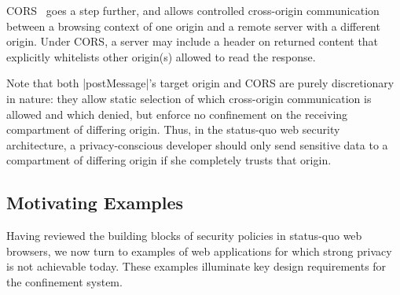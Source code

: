 
CORS~\cite{cors13} goes a step further, and allows controlled
cross-origin communication between a browsing context of one origin
and a remote server with a different origin. Under CORS, a server may
include a header on returned content that explicitly whitelists other
origin(s) allowed to read the response.

%
 
Note that both \js|postMessage|'s target origin and CORS are purely
discretionary in nature: they allow static selection of which
cross-origin communication is allowed and which denied, but enforce no
confinement on the receiving compartment of differing origin. Thus, in
the status-quo web security architecture, a privacy-conscious
developer should only send sensitive data to a compartment of
differing origin if she completely trusts that origin. 

%

\subsection{Motivating Examples}
\label{sec:motivating-examples}

Having reviewed the building blocks of security policies in status-quo
web browsers, we now turn to examples of web applications for which
strong privacy is not achievable today. %
These examples
illuminate key design requirements for the \sys{} confinement
system. %

